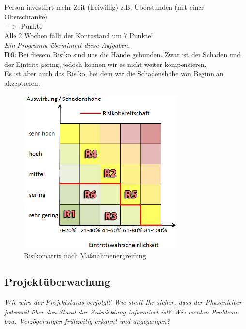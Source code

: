 \documentclass[fontsize=12pt,paper=a4,twoside]{scrartcl}
\begin{document}
\small \color{gray} Person investiert mehr Zeit (freiwillig) z.B. Überstunden (mit einer Oberschranke)\color{black}\\
\small $->$ \color{green}{-1,0 - -5,0 }\color{black} Punkte\\

\small \color{blue} Alle 2 Wochen fällt der Kontostand um 7 Punkte!\color{black}\\

\textit{Ein Programm übernimmt diese Aufgaben.}\\

\textbf{R6:} Bei diesem Risiko sind uns die Hände gebunden. Zwar ist der Schaden und der Eintritt gering, jedoch können wir es nicht weiter kompensieren.\\

Es ist aber auch das Risiko, bei dem wir die Schadenshöhe von Beginn an akzeptieren.\\


\begin{figure}[H]
	\centering
	\includegraphics[width=0.75\textwidth]{src/risikomatrix_after.png}
	\caption{Risikomatrix nach Maßnahmenergreifung}
	\label{fig:matrixtable_after}
\end{figure}


\subsection{Projektüberwachung}\label{sec:controlling}
{\em Wie wird der Projektstatus verfolgt? Wie stellt Ihr sicher, dass
  der Phasenleiter jederzeit über den Stand der Entwicklung informiert
  ist? Wie werden Probleme bzw. Verzögerungen frühzeitig erkannt und
  angegangen?}\\
\end{document}
